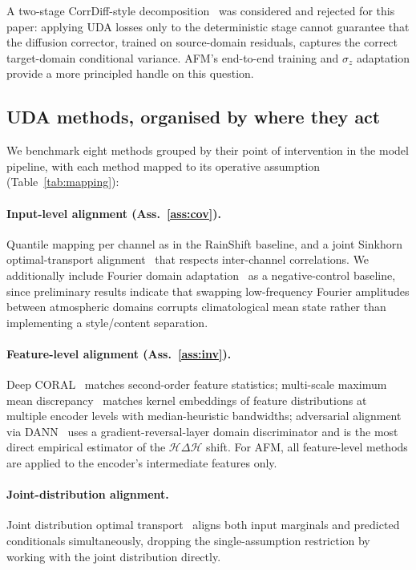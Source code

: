 \documentclass{article}
\begin{document}
A two-stage CorrDiff-style decomposition~\citep{mardani2024corrdiff}
was considered and rejected for this paper: applying UDA losses only
to the deterministic stage cannot guarantee that the diffusion
corrector, trained on source-domain residuals, captures the correct
target-domain conditional variance. AFM's end-to-end training and
$\sigma_z$ adaptation provide a more principled handle on this
question.

\subsection{UDA methods, organised by where they act}

We benchmark eight methods grouped by their point of intervention in
the model pipeline, with each method mapped to its operative
assumption (Table~\ref{tab:mapping}):

\paragraph{Input-level alignment (Ass.~\ref{ass:cov}).} Quantile
mapping per channel as in the RainShift baseline, and a joint Sinkhorn
optimal-transport alignment~\citep{cuturi2013sinkhorn} that respects
inter-channel correlations. We additionally include Fourier domain
adaptation~\citep{yang2020fda} as a negative-control baseline, since
preliminary results indicate that swapping low-frequency Fourier
amplitudes between atmospheric domains corrupts climatological mean
state rather than implementing a style/content separation.

\paragraph{Feature-level alignment (Ass.~\ref{ass:inv}).} Deep
CORAL~\citep{sun2016deep} matches second-order feature statistics;
multi-scale maximum mean discrepancy~\citep{gretton2012kernel,long2015learning}
matches kernel embeddings of feature distributions at multiple encoder
levels with median-heuristic bandwidths; adversarial alignment via
DANN~\citep{ganin2016domain} uses a gradient-reversal-layer domain
discriminator and is the most direct empirical estimator of the
$\mathcal{H}\Delta\mathcal{H}$ shift. For AFM, all feature-level
methods are applied to the encoder's intermediate features only.

\paragraph{Joint-distribution alignment.} Joint distribution optimal
transport~\citep{courty2017jdot} aligns both input marginals and
predicted conditionals simultaneously, dropping the
single-assumption restriction by working with the joint distribution
directly.
\end{document}
